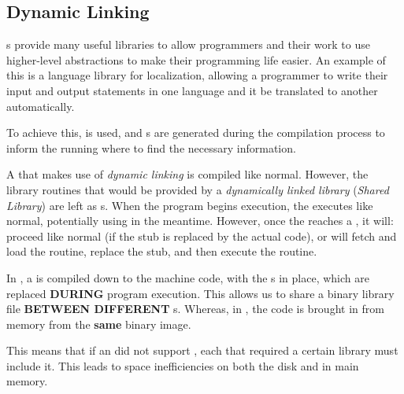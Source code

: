 \subsection{Dynamic Linking}\label{subsec:Dynamic_Linking}
s provide many useful libraries to allow programmers and their work to use higher-level abstractions to make their programming life easier.
An example of this is a language library for localization, allowing a programmer to write their input and output statements in one language and it be translated to another automatically.

To achieve this,  is used, and s are generated during the compilation process to inform the running  where to find the necessary information.

\begin{definition}\label{def:Dynamic_Linking}
  A  that makes use of \emph{dynamic linking} is compiled like normal.
  However, the library routines that would be provided by a \emph{dynamically linked library} (\emph{Shared Library}) are left as s.
  When the program begins execution, the  executes like normal, potentially using  in the meantime.
  However, once the  reaches a , it will: proceed like normal (if the stub is replaced by the actual code), or will fetch and load the routine, replace the stub, and then execute the routine.

  \begin{remark}\label{rmk:Dynamic_Linking_vs_Dynamic_Loading}
    In , a  is compiled down to the machine code, with the s in place, which are replaced \textbf{DURING} program execution.
    This allows us to share a binary library file \textbf{BETWEEN DIFFERENT} s.
    Whereas, in , the code is brought in from memory from the \textbf{same}  binary image.

    This means that if an  did not support , each  that required a certain library must include it.
    This leads to space inefficiencies on both the disk and in main memory.
  \end{remark}
\end{definition}


